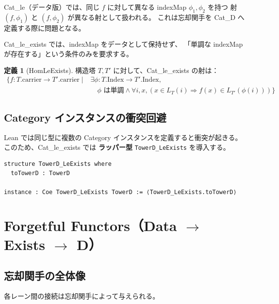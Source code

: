 \documentclass{ltjsarticle}
\theoremstyle{definition}
\newtheorem{definition}{定義}[section]
\begin{document}
Cat\_le（データ版）では、同じ $f$ に対して異なる indexMap $\phi_1, \phi_2$ を持つ
射 $(f, \phi_1)$ と $(f, \phi_2)$ が異なる射として扱われる。
これは忘却関手を Cat\_D へ定義する際に問題となる。

Cat\_le\_exists では、indexMap をデータとして保持せず、
「単調な indexMap が存在する」という条件のみを要求する。

\begin{definition}[HomLeExists]
構造塔 $T, T'$ に対して、Cat\_le\_exists の射は：
\begin{align*}
\{ f: T.\mathrm{carrier} \to T'.\mathrm{carrier} \mid 
&\exists \phi: T.\mathrm{Index} \to T'.\mathrm{Index}, \\
&\quad \phi \text{ は単調} \land \forall i, x, (x \in L_T(i) \Rightarrow f(x) \in L_{T'}(\phi(i))) \}
\end{align*}
\end{definition}

\subsection{Category インスタンスの衝突回避}

Lean では同じ型に複数の Category インスタンスを定義すると衝突が起きる。
このため、Cat\_le\_exists では \textbf{ラッパー型} \texttt{TowerD\_LeExists} を導入する。

\begin{leanbox}[ラッパー型の定義]
\begin{lstlisting}
structure TowerD_LeExists where
  toTowerD : TowerD

instance : Coe TowerD_LeExists TowerD := ⟨TowerD_LeExists.toTowerD⟩
\end{lstlisting}
\end{leanbox}

\section{Forgetful Functors（Data $\to$ Exists $\to$ D）}
\label{sec:functors}

\subsection{忘却関手の全体像}

各レーン間の接続は忘却関手によって与えられる。
\end{document}
